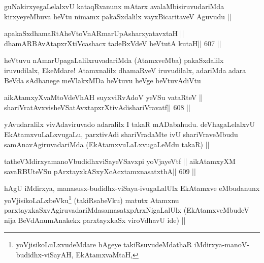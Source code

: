 \begin{artha}
guNakirxyegaLelalxvU kataqRvanunx mAtarx avalaMbisiruvudariMda
kirxyeyeMbuva heVtu nimamx pakaSxdalilx vayxBicaritaveV Aguvudu ||
\end{artha}



\begin{shl}
apakaSxdhamaRtA\footnotemark[4] heVtoVnARmarUpAsharxyatavxtaH ||
dhamARBAvAtapxrXtiVcashacx tadeBxVdeV heVtutA kutaH\hfill || 607 ||
\end{shl}

\begin{artha}
heVtuvu nAmarUpagaLalilxruvadariMda (AtamxveMba) pakaSxdalilx
iruvudilalx, EkeMdare! Atamxnalilx dhamaRveV iruvudilalx, adariMda
adara BeVda sAdhanege meVlakxMDa heVtuvu heVge heVtuvAdiVtu
\end{artha}

\begin{shl}
aikAtamxyXvaMtoV\footnotemark[1] deVhAH suyxviRvAdoV yeVSu vataRteV ||
shariVratAvxvisheVSatAvxtapxrXtivAdishariVravatf\hfill || 608 ||
\end{shl}

\begin{artha}
yAvudaralilx vivAdaviruvado adaralilx I takaR mADabahudu.
deVhagaLelalxvU EkAtamxvuLaLxvugaLu, parxtivAdi shariVradaMte ivU
shariVraveMbudu samAnavAgiruvadariMda (EkAtamxvuLaLxvugaLeMdu takaR) ||
\end{artha}

\begin{shl}
tatheVMdirxyamanoVbudidhxviSayeVSavxpi yoVjayeVtf ||
aikAtamxyXM savaRBUteVSu pArxtayxkASxyXcAcx\s\s tamxnasatxthA\hfill || 609 ||
\end{shl}

\begin{artha}
hAgU iMdirxya, manasusx-budidhx-viSaya-ivugaLalUlx EkAtamxve eMbudanunx
yoVjisikoLaLxbeVku\footnote[2]{yoVjisikoLuLxvudeMdare hAgeye
  takiRsuvudeMdathaR iMdirxya-manoV-budidhx-viSayAH, EkAtamxvaMtaH,} (takiRsabeVku) matutx Atamxnu
parxtayxkaSxvAgiruvadariMda\footnotemark[2]
samasatx\footnotemark[1]pArxNigaLalUlx (EkAtamxveMbudeV nija 
BeVdAnumAnakekx parxtayxkaSx viroVdhavU ide) ||
\end{artha}

